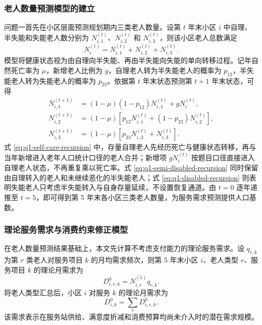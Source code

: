 \subsubsection{老人数量预测模型的建立}

问题一首先在小区层面预测规划期内三类老人数量。设第 $t$ 年末小区 $i$ 中自理、半失能和失能老人数分别为 $N_{i,1}^{(t)}$、$N_{i,2}^{(t)}$ 和 $N_{i,3}^{(t)}$，则该小区老人总数满足
\begin{equation}
  N_i^{(t)}=N_{i,1}^{(t)}+N_{i,2}^{(t)}+N_{i,3}^{(t)}.
  \label{eq:q1-population-total}
\end{equation}
模型将健康状态视为由自理向半失能、再由半失能向失能的单向转移过程。记年自然死亡率为 $\mu$，新增老人比例为 $g$，自理老人转为半失能老人的概率为 $p_{12}$，半失能老人转为失能老人的概率为 $p_{23}$。依据第 $t$ 年末状态预测第 $t+1$ 年末状态，可得
\begin{align}
  N_{i,1}^{(t+1)}
  &=(1-\mu)(1-p_{12})N_{i,1}^{(t)}+gN_i^{(t)}, \label{eq:q1-self-care-recursion}\\
  N_{i,2}^{(t+1)}
  &=(1-\mu)\left[p_{12}N_{i,1}^{(t)}+(1-p_{23})N_{i,2}^{(t)}\right], \label{eq:q1-semi-disabled-recursion}\\
  N_{i,3}^{(t+1)}
  &=(1-\mu)\left[p_{23}N_{i,2}^{(t)}+N_{i,3}^{(t)}\right]. \label{eq:q1-disabled-recursion}
\end{align}
式 \eqref{eq:q1-self-care-recursion} 中，存量自理老人先经历死亡与健康状态转移，再与当年新增进入老年人口统计口径的老人合并；新增项 $gN_i^{(t)}$ 按题目口径直接进入自理老人状态，不再重复乘以死亡率。式 \eqref{eq:q1-semi-disabled-recursion} 同时保留由自理转入的老人和未继续恶化的半失能老人；式 \eqref{eq:q1-disabled-recursion} 则表明失能老人只考虑半失能转入与自身存量延续，不设置恢复通道。由 $t=0$ 逐年递推至 $t=5$，即可得到第 5 年末各小区三类老人数量，为服务需求预测提供人口基数。

\subsubsection{理论服务需求与消费约束修正模型}

在老人数量预测结果基础上，本文先计算不考虑支付能力的理论服务需求。设 $q_{r,k}$ 为第 $r$ 类老人对服务项目 $k$ 的月均需求频次，则第 5 年末小区 $i$、老人类型 $r$、服务项目 $k$ 的理论月需求为
\begin{equation}
  D_{i,r,k}^{0}=N_{i,r}^{(5)}q_{r,k}.
  \label{eq:q1-theoretical-demand}
\end{equation}
将老人类型汇总后，小区 $i$ 对服务 $k$ 的理论月需求为
\begin{equation}
  D_{i,k}^{0}=\sum_r D_{i,r,k}^{0}.
  \label{eq:q1-theoretical-demand-community}
\end{equation}
该需求表示在服务站供给、满意度折减和消费预算均尚未介入时的潜在需求规模。

